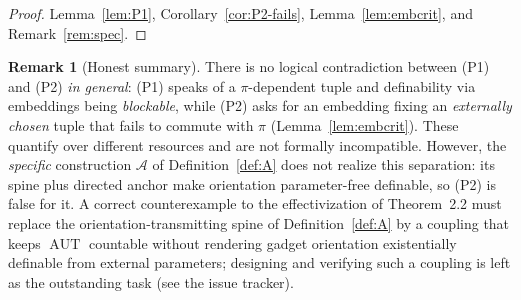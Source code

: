 \documentclass[12pt,fullpage]{article}
\theoremstyle{definition}
\newtheorem{remark}[theorem]{Remark}
\newcommand{\A}{\mathcal{A}}
\newcommand{\AUT}{\operatorname{AUT}}
\begin{document}
\begin{proof}
Lemma~\ref{lem:P1}, Corollary~\ref{cor:P2-fails}, Lemma~\ref{lem:embcrit}, and
Remark~\ref{rem:spec}.
\end{proof}

\begin{remark}[Honest summary]
There is no logical contradiction between (P1) and (P2) \emph{in general}:
(P1) speaks of a $\pi$-dependent tuple and definability via embeddings being
\emph{blockable}, while (P2) asks for an embedding fixing an
\emph{externally chosen} tuple that fails to commute with $\pi$
(Lemma~\ref{lem:embcrit}).  These quantify over different resources and are
not formally incompatible.  However, the \emph{specific} construction $\A$ of
Definition~\ref{def:A} does not realize this separation: its spine plus
directed anchor make orientation parameter-free definable, so (P2) is false
for it.  A correct counterexample to the effectivization of Theorem~2.2 must
replace the orientation-transmitting spine of Definition~\ref{def:A} by a
coupling that keeps $\AUT$ countable without rendering gadget orientation
existentially definable from external parameters; designing and verifying such
a coupling is left as the outstanding task (see the issue tracker).
\end{remark}
\end{document}

